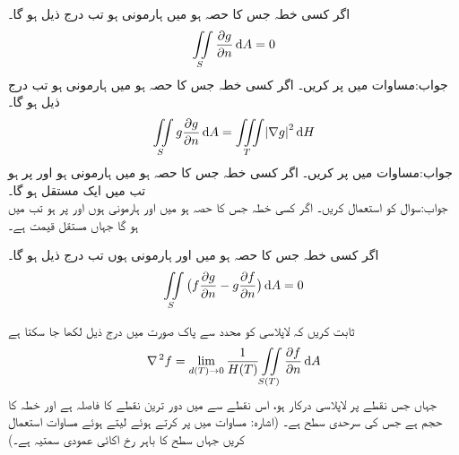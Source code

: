 \quad اگر کسی خطہ جس کا  حصہ ہو  میں  ہارمونی ہو تب درج ذیل ہو گا۔
\begin{align*}
\iint\limits_S \frac{\partial g}{\partial n}\dif A=0
\end{align*}
جواب:\quad مساوات  میں  پر کریں۔
\quad اگر کسی خطہ جس کا  حصہ ہو  میں  ہارمونی ہو تب درج ذیل ہو گا۔
\begin{align*}
\iint\limits_S g\frac{\partial g}{\partial n}\dif A=\iiint \limits_T \abs{\nabla g}^2 \dif H
\end{align*}
جواب:\quad مساوات  میں  پر کریں۔
\quad اگر کسی خطہ جس کا  حصہ ہو  میں  ہارمونی ہو  اور  پر   ہو  تب  میں  ایک مستقل ہو گا۔ \\
جواب:\quad سوال  کو استعمال کریں۔
\quad  اگر کسی خطہ جس کا  حصہ ہو  میں  اور  ہارمونی ہوں اور  پر  ہو تب  میں  ہو گا جہاں  مستقل قیمت ہے۔

\quad  اگر کسی خطہ جس کا  حصہ ہو  میں  اور  ہارمونی ہوں تب درج ذیل ہو گا۔
\begin{align*}
\iint\limits_S \big(f\frac{\partial g}{\partial n}-g\frac{\partial f}{\partial n}\big)\dif A=0
\end{align*}

\quad ثابت کریں کہ لاپلاسی کو محدد سے پاک صورت میں درج ذیل لکھا جا سکتا ہے
\begin{align*}
\nabla^{\,2}f=\lim_{d(T)\to 0}\frac{1}{H(T)}\iint\limits_{S(T)} \frac{\partial f}{\partial n}\dif A
\end{align*}
جہاں جس نقطے پر لاپلاسی درکار ہو، اس نقطے سے  میں دور ترین نقطے کا فاصلہ  ہے اور  خطہ  کا حجم ہے جس کی سرحدی سطح  ہے۔ (اشارہ: مساوات  میں  پر کرتے ہوئے  لیتے ہوئے مساوات  استعمال کریں جہاں  سطح  کا باہر رخ اکائی عمودی سمتیہ ہے۔)



